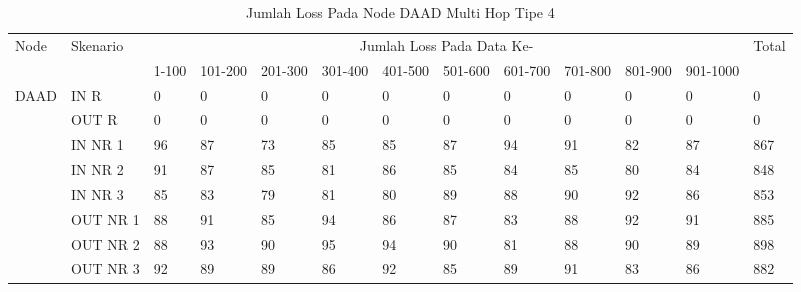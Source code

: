 \begin{table}[H]
  \centering
  \caption{Jumlah Loss Pada Node DAAD Multi Hop Tipe 4}
    \begin{tabular}{|p{1cm}|p{1.9cm}|p{0.6cm}|p{0.6cm}|p{0.6cm}|p{0.6cm}|p{0.6cm}|p{0.6cm}|p{0.6cm}|p{0.6cm}|p{0.6cm}|p{0.6cm}|p{1cm}|}
    \hline
        \multirow{2}{*}{Node}&\multirow{2}{*}{Skenario}&\multicolumn{10}{|c|}{Jumlah Loss Pada Data Ke-}&\multirow{2}{*}{Total} \\\cline{3-12}
          & & 1-100 & 101-200 & 201-300 & 301-400 & 401-500 & 501-600 & 601-700 & 701-800 & 801-900 & 901-1000 & \\
        \hline
    \multirow{8}{*}{DAAD}  
   & IN R  & 0     & 0     & 0     & 0     & 0     & 0     & 0     & 0     & 0     & 0     & 0 \\
          & OUT R & 0     & 0     & 0     & 0     & 0     & 0     & 0     & 0     & 0     & 0     & 0 \\
          & IN NR 1 & 96    & 87    & 73    & 85    & 85    & 87    & 94    & 91    & 82    & 87    & 867 \\
          & IN NR 2 & 91    & 87    & 85    & 81    & 86    & 85    & 84    & 85    & 80    & 84    & 848 \\
          & IN NR 3 & 85    & 83    & 79    & 81    & 80    & 89    & 88    & 90    & 92    & 86    & 853 \\
          & OUT NR 1 & 88    & 91    & 85    & 94    & 86    & 87    & 83    & 88    & 92    & 91    & 885 \\
          & OUT NR 2 & 88    & 93    & 90    & 95    & 94    & 90    & 81    & 88    & 90    & 89    & 898 \\
          & OUT NR 3 & 92    & 89    & 89    & 86    & 92    & 85    & 89    & 91    & 83    & 86    & 882 \\
    
        \hline
    \end{tabular}%
  \label{tab:addlabel}%
\end{table}%
